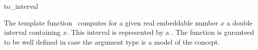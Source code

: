 \begin{ccRefFunction}{to_interval}

\ccDefinition

The template function \ccRefName\ computes for a given real embeddable 
number $x$ a double interval containing $x$. 
This interval is represented by a . 
The function is guranteed to be well defined in case the argument type 
is a model of the  concept. 


{}

\ccSeeAlso

\\
\\

\end{ccRefFunction}
